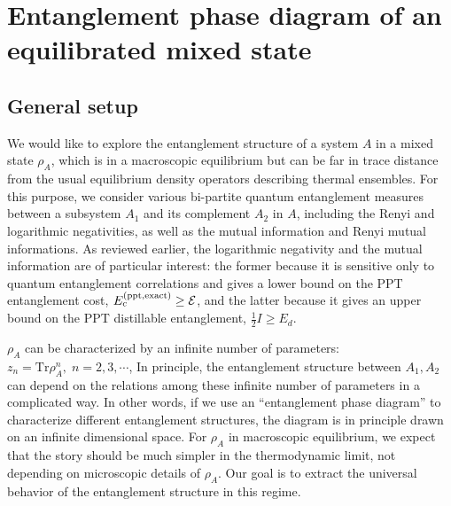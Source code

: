 \documentclass[a4paper,11pt]{article}
\newcommand\sE{{\ensuremath{{\mathcal E}}}}
\newcommand{\Tr}{\text{Tr}}
\begin{document}
\section{Entanglement phase diagram of an equilibrated mixed state} 
\label{phase_diag_sec}

\subsection{General setup} 

We would like to explore the entanglement structure of a system $A$ in a mixed state $\rho_A$, which is in a macroscopic equilibrium but can be far in trace distance from the usual equilibrium density operators describing thermal ensembles. 
For this purpose, we consider various bi-partite quantum entanglement measures between a subsystem $A_1$ and its complement $A_2$ in $A$, including the Renyi and logarithmic negativities, as well as the mutual information and Renyi mutual informations. As reviewed earlier, the logarithmic negativity and the mutual information are of particular interest: the former because it is sensitive only to quantum entanglement correlations and gives a lower bound on the PPT entanglement cost, $E_c^{\rm (ppt, exact)}\geq \sE$, and the latter because it gives an upper bound on the PPT distillable entanglement, $\frac{1}{2} I \geq E_d$. %

$\rho_A$ can be characterized by an infinite number of parameters: $z_n = \Tr \rho_A^n, \; n=2, 3, \cdots$, In principle, the entanglement structure between $A_1, A_2$ can depend on the relations among these infinite number of parameters in a complicated way. In other words, if we use an ``entanglement phase diagram'' to characterize different entanglement structures, the diagram is in principle drawn on an infinite dimensional space. For $\rho_A$ in macroscopic equilibrium, we expect that
the story should be much simpler in the thermodynamic limit, not depending on microscopic details of $\rho_A$. Our goal is to 
extract the universal behavior of the entanglement structure in this regime. 
\end{document}

